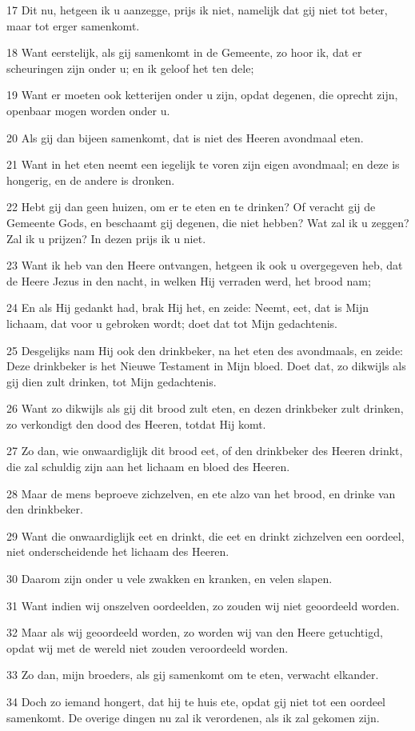 \par 17 Dit nu, hetgeen ik u aanzegge, prijs ik niet, namelijk dat gij niet tot beter, maar tot erger samenkomt.
\par 18 Want eerstelijk, als gij samenkomt in de Gemeente, zo hoor ik, dat er scheuringen zijn onder u; en ik geloof het ten dele;
\par 19 Want er moeten ook ketterijen onder u zijn, opdat degenen, die oprecht zijn, openbaar mogen worden onder u.
\par 20 Als gij dan bijeen samenkomt, dat is niet des Heeren avondmaal eten.
\par 21 Want in het eten neemt een iegelijk te voren zijn eigen avondmaal; en deze is hongerig, en de andere is dronken.
\par 22 Hebt gij dan geen huizen, om er te eten en te drinken? Of veracht gij de Gemeente Gods, en beschaamt gij degenen, die niet hebben? Wat zal ik u zeggen? Zal ik u prijzen? In dezen prijs ik u niet.
\par 23 Want ik heb van den Heere ontvangen, hetgeen ik ook u overgegeven heb, dat de Heere Jezus in den nacht, in welken Hij verraden werd, het brood nam;
\par 24 En als Hij gedankt had, brak Hij het, en zeide: Neemt, eet, dat is Mijn lichaam, dat voor u gebroken wordt; doet dat tot Mijn gedachtenis.
\par 25 Desgelijks nam Hij ook den drinkbeker, na het eten des avondmaals, en zeide: Deze drinkbeker is het Nieuwe Testament in Mijn bloed. Doet dat, zo dikwijls als gij dien zult drinken, tot Mijn gedachtenis.
\par 26 Want zo dikwijls als gij dit brood zult eten, en dezen drinkbeker zult drinken, zo verkondigt den dood des Heeren, totdat Hij komt.
\par 27 Zo dan, wie onwaardiglijk dit brood eet, of den drinkbeker des Heeren drinkt, die zal schuldig zijn aan het lichaam en bloed des Heeren.
\par 28 Maar de mens beproeve zichzelven, en ete alzo van het brood, en drinke van den drinkbeker.
\par 29 Want die onwaardiglijk eet en drinkt, die eet en drinkt zichzelven een oordeel, niet onderscheidende het lichaam des Heeren.
\par 30 Daarom zijn onder u vele zwakken en kranken, en velen slapen.
\par 31 Want indien wij onszelven oordeelden, zo zouden wij niet geoordeeld worden.
\par 32 Maar als wij geoordeeld worden, zo worden wij van den Heere getuchtigd, opdat wij met de wereld niet zouden veroordeeld worden.
\par 33 Zo dan, mijn broeders, als gij samenkomt om te eten, verwacht elkander.
\par 34 Doch zo iemand hongert, dat hij te huis ete, opdat gij niet tot een oordeel samenkomt. De overige dingen nu zal ik verordenen, als ik zal gekomen zijn.

